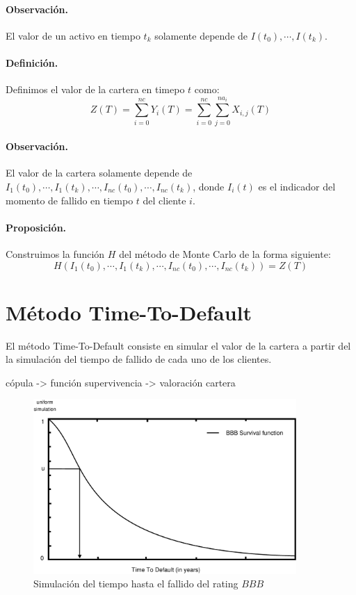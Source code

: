 \paragraph{Observaci\'on.} El valor de un activo en tiempo $t_k$ solamente 
depende de $I(t_0), \cdots, I(t_k)$.

\paragraph{Definici\'on.} Definimos el valor de la cartera en timepo $t$ como:
\begin{displaymath}
Z(T) = \sum_{i=0}^{nc} Y_i(T) = \sum_{i=0}^{nc} \sum_{j=0}^{na_i} X_{i,j}(T)
\end{displaymath}

\paragraph{Observaci\'on.} El valor de la cartera solamente depende de 
$I_1(t_0), \cdots, I_1(t_k), \cdots, I_{nc}(t_0), \cdots, I_{nc}(t_k)$, donde 
$I_i(t)$ es el indicador del momento de fallido en tiempo $t$ del cliente $i$.

\paragraph{Proposici\'on.} Construimos la funci\'on $H$ del m\'etodo de Monte 
Carlo de la forma siguiente:
\begin{displaymath}
H(I_1(t_0),\cdots,I_1(t_k),\cdots,I_{nc}(t_0),\cdots,I_{nc}(t_k)) = Z(T)
\end{displaymath}


\section{M\'etodo Time-To-Default}


El m\'etodo Time-To-Default consiste en simular el valor de la cartera a partir 
del la simulaci\'on del tiempo de fallido de cada uno de los clientes.

c\'opula -> funci\'on supervivencia -> valoraci\'on cartera

\begin{figure}[!hb]
\begin{center}
\includegraphics[width=10cm,angle=0]{./images/simttd.eps}
\caption{Simulaci\'on del tiempo hasta el fallido del rating $BBB$}
\label{simttd}
\end{center}
\end{figure}


